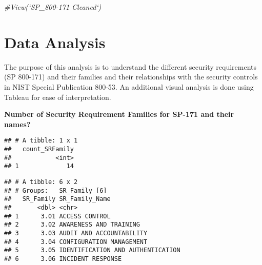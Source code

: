 \documentclass[]{article}
\newenvironment{Shaded}{\begin{snugshade}}{\end{snugshade}}
\newcommand{\KeywordTok}[1]{\textcolor[rgb]{0.13,0.29,0.53}{\textbf{#1}}}
\newcommand{\DataTypeTok}[1]{\textcolor[rgb]{0.13,0.29,0.53}{#1}}
\newcommand{\StringTok}[1]{\textcolor[rgb]{0.31,0.60,0.02}{#1}}
\newcommand{\CommentTok}[1]{\textcolor[rgb]{0.56,0.35,0.01}{\textit{#1}}}
\newcommand{\OperatorTok}[1]{\textcolor[rgb]{0.81,0.36,0.00}{\textbf{#1}}}
\newcommand{\NormalTok}[1]{#1}
\begin{document}
\begin{Shaded}
\begin{Highlighting}[]
\CommentTok{#View(`SP_800-171 Cleaned`)}
\end{Highlighting}
\end{Shaded}

\section{Data Analysis}\label{data-analysis}

The purpose of this analysis is to understand the different security
requirements (SP 800-171) and their families and their relationships
with the security controls in NIST Special Publication 800-53. An
additional visual analysis is done using Tableau for ease of
interpretation.

\textbf{Number of Security Requirement Families for SP-171 and their
names?}

\begin{Shaded}
\end{Shaded}

\begin{verbatim}
## # A tibble: 1 x 1
##   count_SRFamily
##            <int>
## 1             14
\end{verbatim}

\begin{Shaded}
\end{Shaded}

\begin{verbatim}
## # A tibble: 6 x 2
## # Groups:   SR_Family [6]
##   SR_Family SR_Family_Name                   
##       <dbl> <chr>                            
## 1      3.01 ACCESS CONTROL                   
## 2      3.02 AWARENESS AND TRAINING           
## 3      3.03 AUDIT AND ACCOUNTABILITY         
## 4      3.04 CONFIGURATION MANAGEMENT         
## 5      3.05 IDENTIFICATION AND AUTHENTICATION
## 6      3.06 INCIDENT RESPONSE
\end{verbatim}
\end{document}
